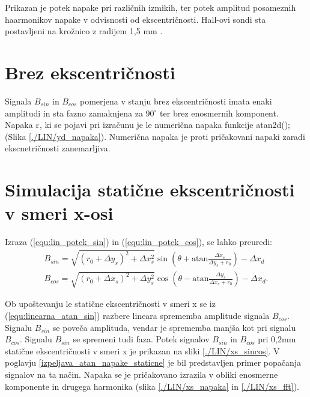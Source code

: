 Prikazan je potek napake pri različnih izmikih, ter potek amplitud posameznih haarmonikov napake v odvisnosti od ekscentričnosti.
Hall-ovi sondi sta postavljeni na krožnico z radijem 1,5 mm \cite{AM8192}.
\section{Brez ekscentričnosti}
Signala $B_{sin}$ in $B_{cos}$ pomerjena v stanju brez ekscentričnosti imata enaki amplitudi in sta fazno zamaknjena za $90^{\circ}$ ter brez enosmernih komponent. Napaka $\varepsilon$, ki se pojavi pri izračunu je le numerična napaka funkcije atan2d(); (Slika \ref{./LIN/yd_napaka}). Numerična napaka je proti pričakovani napaki zaradi ekscnetričnosti zanemarljiva.
\section{Simulacija statične ekscentričnosti v smeri x-osi}

Izraza (\ref{equ:lin_potek_sin}) in (\ref{equ:lin_potek_cos}), se lahko preuredi:
\begin{eqnarray}
\label{equ:linearna_atan_sin}
B_{sin}= \sqrt{(r_0+\Delta y_s)^2+\Delta x_s^2} \sin(\theta+  \mathrm{ atan} \frac{\Delta x_s}{\Delta y_s +r_0})-\Delta x_d\\
\label{equ:linearna_atan_cos}
B_{cos}= \sqrt{(r_0+\Delta x_s)^2+\Delta y_s^2} \cos(\theta-  \mathrm{ atan} \frac{\Delta y_s}{\Delta x_s +r_0}) -\Delta x_d.
\end{eqnarray}

Ob upoštevanju le statične ekscentričnosti v smeri x se iz (\ref{equ:linearna_atan_sin}) razbere lineara sprememba amplitude signala $B_{cos}$.
Signalu $B_{sin}$ se poveča amplituda, vendar je sprememba manjša kot pri signalu $B_{cos}$. Signalu $B_{sin}$ se spremeni tudi faza.
Potek signalov $B_{sin}$ in $B_{cos}$ pri 0,2mm statične ekscentričnosti v smeri x je prikazan na sliki \ref{./LIN/xs_sincos}.
V poglavju \ref{izpeljava_atan_napake_staticne} je bil predstavljen primer popačanja signalov na ta način.
Napaka se je pričakovano izrazila v obliki enosmerne komponente in drugega harmonika (slika \ref{./LIN/xs_napaka} in \ref{./LIN/xs_fft}).
